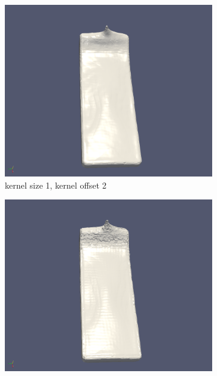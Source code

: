 \begin{figure}[H]
\begin{subfigure}[b]{0.5\textwidth}
               \label{fig:ks1ko1}
        \end{subfigure}
        \begin{subfigure}[b]{0.5\textwidth}
               \includegraphics[width=\textwidth]{figures/DBBlur_ks-1_ko-2.png}
               \caption{kernel size 1, kernel offset 2}
               \label{fig:ks1ko2}
        \end{subfigure}
        \begin{subfigure}[b]{0.5\textwidth}
               \includegraphics[width=\textwidth]{figures/DBBlur_ks-1_ko-4.png}

\end{subfigure}
\end{figure}
